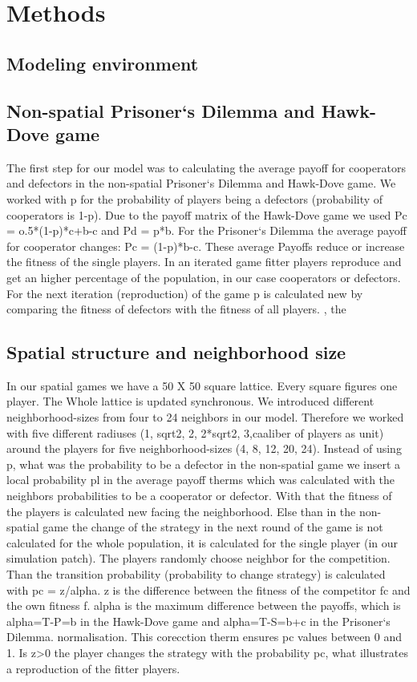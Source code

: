 \section{Methods}

\subsection{Modeling environment}

\subsection{Non-spatial Prisoner`s Dilemma and Hawk-Dove game}

The first step for our model was to calculating the average payoff for cooperators and defectors in the non-spatial Prisoner`s Dilemma and Hawk-Dove game. We worked with p for the probability of players being a  defectors (probability of cooperators is 1-p). Due to the payoff matrix of the Hawk-Dove game we used Pc = o.5*(1-p)*c+b-c and Pd = p*b. For the Prisoner`s Dilemma the average payoff for cooperator changes: Pc = (1-p)*b-c. These average Payoffs reduce or increase the fitness of the single players. In an iterated game fitter players reproduce and get an higher percentage of the population, in our case cooperators or defectors. For the next iteration (reproduction) of the game p is calculated new by comparing the fitness of defectors with the fitness of all players.
, the 
\subsection{Spatial structure and neighborhood size}
In our spatial games we have a 50 X 50 square lattice. Every square figures one player. The Whole lattice is updated synchronous. We introduced different neighborhood-sizes from four to 24 neighbors in our model. Therefore we worked with five different radiuses (1, sqrt2, 2, 2*sqrt2, 3,caaliber of players as unit) around the players for five neighborhood-sizes (4, 8, 12, 20, 24). Instead of using p, what was the probability to be a defector in the non-spatial game we insert a local probability pl in the average payoff therms which was calculated with the neighbors probabilities to be a cooperator or defector. With that the fitness of the players is calculated new facing the neighborhood. Else than in the non-spatial game the change of the strategy in the next round of the game is not calculated for the whole population, it is calculated for the single player (in our simulation patch). The players randomly choose neighbor for the competition. Than the transition probability (probability to change strategy) is calculated with pc = z/alpha. z is the difference between the fitness of the competitor fc and the own fitness f. alpha is the maximum difference between the payoffs, which is alpha=T-P=b in the Hawk-Dove game and alpha=T-S=b+c in the Prisoner`s Dilemma. normalisation. This corecction therm ensures pc values between 0 and 1. Is z>0 the player changes the strategy with the probability pc, what illustrates a reproduction of the fitter players.

